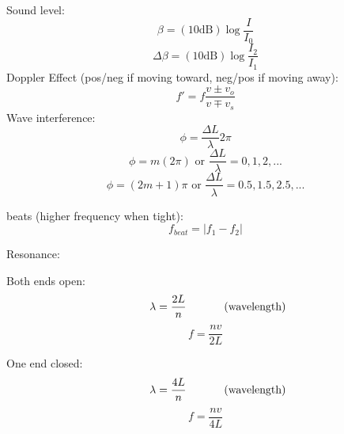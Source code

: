 \documentclass[11pt]{article}
\begin{document}
    \noindent Sound level:
    \begin{equation}
        \beta = (10 \text{dB}) \log \frac{I}{I_0} \tag{sound level}
    \end{equation}
    \begin{equation}
        \Delta  \beta = (10 \text{dB}) \log \frac{I_2}{I_1} \tag{sound level}
    \end{equation}
    \noindent Doppler Effect (pos/neg if moving toward, neg/pos if moving away):
    \begin{equation}
        f' = f \frac{v \pm v_o}{v \mp v_s }  \tag{Doppler Effect}\label{doppler}
    \end{equation}
    \noindent Wave interference:
    \begin{equation}
        \phi = \frac{\Delta L}{\lambda} 2 \pi \tag{phase difference}
    \end{equation}
    \begin{equation}
        \phi = m(2\pi) \text{ or } \frac{\Delta L}{\lambda} = 0,1,2,... \tag{fully constructive}
    \end{equation}
    \begin{equation}
        \phi = (2m+1)\pi \text{ or } \frac{\Delta L}{\lambda} = 0.5,1.5,2.5,... \tag{fully destructive}
    \end{equation}

    \noindent beats (higher frequency when tight):
    \begin{equation}
        f_{beat} = \left |f_1 - f_2 \tag{beat frequency} \right|
    \end{equation}

    \noindent Resonance:

    \begin{minipage}[t]{0.5\textwidth}
        \noindent Both ends open:
    \begin{align}
        \hspace*{0.8cm} \lambda = \frac{2L}{n} \hspace{0.5cm} \tag{wavelength}
    \end{align}
    \begin{equation}
        f = \frac{nv}{2L} \tag{resonance}
    \end{equation}
    \end{minipage}
    \begin{minipage}[t]{0.5\textwidth}
        \noindent One end closed:
        \begin{align}
            \hspace*{0.8cm} \lambda = \frac{4L}{n} \hspace{0.5cm} \tag{wavelength}
        \end{align}
        \begin{equation}
            f = \frac{nv}{4L} \tag{resonance}
        \end{equation}
        \end{minipage}
\end{document}
